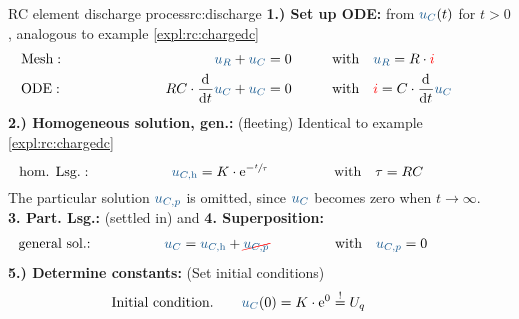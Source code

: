 {\begin{expl}{RC element discharge process}{rc:discharge}
        \begingroup %
            \addtolength{\jot}{2pt} %
        \textbf{1.) Set up ODE:} from $\ecv{u_C}(t)$ for $t>0$, analogous to example \ref{expl:rc:chargedc}
            \begin{align*}
            &\text{Mesh}:&&&
                \ecv{u_R} + \ecv{u_C}  &= 0&&&
                &\text{with}\quad \ecv{u_R} = R \cdot \eci{i} \\
            &\text{ODE}:&&&
                RC \cdot \dt \ecv{u_C}  + \ecv{u_C}   &= 0 &&&
                &\text{with}\quad \eci{i} = C \cdot \dt \ecv{u_C}
            \\[-15pt]&\hphantom{R1ooooooo}&&&\hphantom{L3oooooooooooooooooooo}&\hphantom{R3ooo}&&&&\hphantom{R5oooooooooooooooooooooo}\nonumber%
        \end{align*}%
        \textbf{2.) Homogeneous solution, gen.:} (fleeting) Identical to example \ref{expl:rc:chargedc}%
        \begin{align*}%
            &\text{hom. Lsg.}:&&&
                \ecv{u_{C,\mathrm{h}}} = K \cdot \mathrm{e}^{-\sfrac{t}{\tau}}&&&&
                &\text{with}\quad \tau = RC
            \\[-15pt]&\hphantom{R1ooooooo}&&&\hphantom{L3oooooooooooooooooooo}&\hphantom{R3ooo}&&&&\hphantom{R5oooooooooooooooooooooo}\nonumber%
        \end{align*}%
        The particular solution $\ecv{u_{C,p}}$ is omitted, since $\ecv{u_C}$ becomes zero when $t \to \infty$.\\[6pt]%
        \textbf{3. Part. Lsg.:} (settled in) and \textbf{4. Superposition:}%
        \begin{align*}%
            &\text{general sol.:}&&&
                \ecv{u_C} &= \ecv{u_{C,\mathrm{h}}} + \redcancel{\ecv{u_{C,p}}}&&&
                &\text{with}\quad \ecv{u_{C,p}}=0
            \\[-15pt]&\hphantom{R1oooooooooooo}&&&\hphantom{L3ooo}&\hphantom{R3oooooooooooooooo}&&&&\hphantom{R5oooooooooooooooooooooo}\nonumber%
        \end{align*}%
        \textbf{5.) Determine constants:} (Set initial conditions)%
        \begin{align*}%
            &\text{Initial condition.}&&&
                \ecv{u_C}(0) &= K \cdot \mathrm{e}^{0} \overset{!}{=} U_q &&&&

\end{align*}
\end{expl}}
